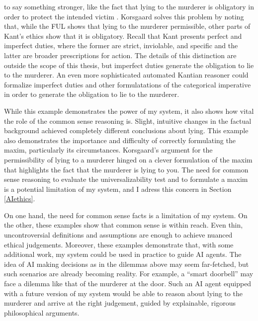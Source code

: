 \begin{isabellebody}
\begin{isamarkuptext}
{to say something stronger, like the fact that lying to the murderer is obligatory in order to protect
the intended victim \citep[15]{KorsgaardRTL}. Korsgaard solves this problem by 
noting that, while the FUL shows that lying to the murderer permissible, other parts of Kant's ethics
show that it is obligatory. Recall that Kant presents perfect and imperfect duties,
where the former are strict, inviolable, and specific and the latter are broader prescriptions for action.
The details of this distinction are outside the scope of this thesis, but imperfect duties generate 
the obligation to lie to the murderer. An even more sophisticated automated Kantian reasoner could formalize 
imperfect duties and other formulatations of the categorical imperative in order to generate the 
obligation to lie to the murderer.}

While this example demonstrates the power of my system, it
also shows how vital the role of the common sense reasoning is. Slight, intuitive changes in the factual
background achieved completely different conclusions about lying. This example also demonstrates the importance
and difficulty of correctly formulating the maxim, particularly its circumstances.
Korsgaard's argument for the permissibility of lying to a 
murderer hinged on a clever formulation of the maxim that highlights the fact that the murderer is lying to you.
The need for common sense reasoning to evaluate the universalizability test and to formulate a maxim
is a potential limitation of my system, and I adress this concern in Section \ref{AIethics}.

On one hand, the need for common sense facts is a 
limitation of my system. On the other, these examples show that common sense is within reach. Even thin, 
uncontroversial definitions and assumptions are enough to achieve nuanced ethical judgements. Moreover, 
these examples demonstrate that, with some additional work, my system could be used in practice 
to guide AI agents. The idea of AI making decisions as in the dilemmas above may seem far-fetched, but
such scenarios are already becoming reality. For example, a ``smart doorbell'' may face a dilemma like that of
the murderer at the door. Such an AI agent equipped with a future version of my 
system would be able to reason about lying to the murderer and arrive at the right judgement, guided by
explainable, rigorous philosophical arguments.%
\end{isamarkuptext}\isamarkuptrue%
%
\isadelimtheory
%
\endisadelimtheory
%
\isatagtheory
%
\endisatagtheory
{\isafoldtheory}%
%
\isadelimtheory
%
\endisadelimtheory
%
\end{isabellebody}%
